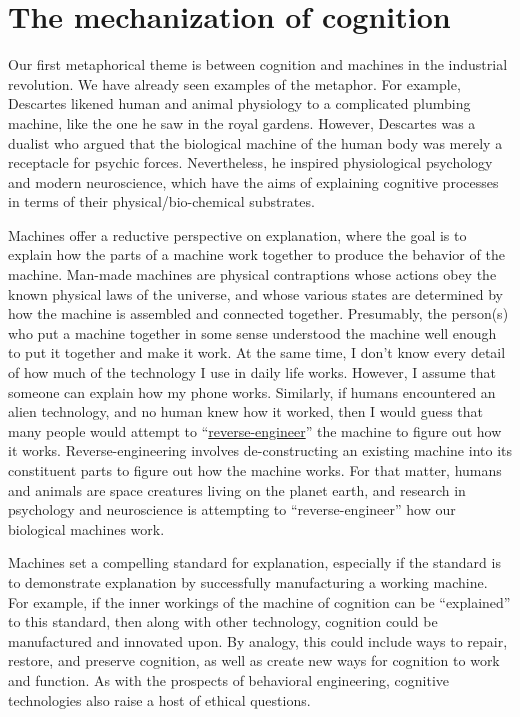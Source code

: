 \documentclass[
  oneside,
  12pt]{crumpbook}
\begin{document}
\hypertarget{the-mechanization-of-cognition}{%
\section{The mechanization of cognition}\label{the-mechanization-of-cognition}}

Our first metaphorical theme is between cognition and machines in the industrial revolution. We have already seen examples of the metaphor. For example, Descartes likened human and animal physiology to a complicated plumbing machine, like the one he saw in the royal gardens. However, Descartes was a dualist who argued that the biological machine of the human body was merely a receptacle for psychic forces. Nevertheless, he inspired physiological psychology and modern neuroscience, which have the aims of explaining cognitive processes in terms of their physical/bio-chemical substrates.

Machines offer a reductive perspective on explanation, where the goal is to explain how the parts of a machine work together to produce the behavior of the machine. Man-made machines are physical contraptions whose actions obey the known physical laws of the universe, and whose various states are determined by how the machine is assembled and connected together. Presumably, the person(s) who put a machine together in some sense understood the machine well enough to put it together and make it work. At the same time, I don't know every detail of how much of the technology I use in daily life works. However, I assume that someone can explain how my phone works. Similarly, if humans encountered an alien technology, and no human knew how it worked, then I would guess that many people would attempt to ``\href{https://en.wikipedia.org/wiki/Reverse_engineering}{reverse-engineer}'' the machine to figure out how it works. Reverse-engineering involves de-constructing an existing machine into its constituent parts to figure out how the machine works. For that matter, humans and animals are space creatures living on the planet earth, and research in psychology and neuroscience is attempting to ``reverse-engineer'' how our biological machines work.

Machines set a compelling standard for explanation, especially if the standard is to demonstrate explanation by successfully manufacturing a working machine. For example, if the inner workings of the machine of cognition can be ``explained'' to this standard, then along with other technology, cognition could be manufactured and innovated upon. By analogy, this could include ways to repair, restore, and preserve cognition, as well as create new ways for cognition to work and function. As with the prospects of behavioral engineering, cognitive technologies also raise a host of ethical questions.
\end{document}
